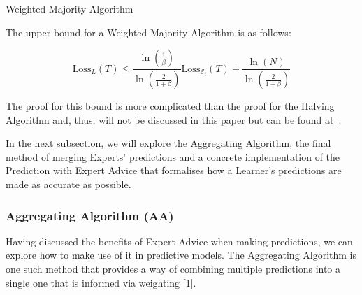 \begin{algorithm}[ht]
    \caption{Weighted Majority Algorithm}\label{weighted_majority_algorithm}
    \begin{algorithmic}[1]
    \end{algorithmic}
\end{algorithm}

The upper bound for a Weighted Majority Algorithm is as follows:

\begin{equation}
    \text{Loss}_L(T) \leq \frac{\ln (\frac{1}{\beta})}{\ln (\frac{2}{1 + \beta})} \text{Loss}_{\mathcal{E}_i}(T) + \frac{\ln(N)}{\ln(\frac{2}{1+\beta})}
\end{equation}

The proof for this bound is more complicated than the proof for the Halving Algorithm and, thus, will not be discussed in this paper but can be found at~\cite{littlestone:1994}.

In the next subsection, we will explore the Aggregating Algorithm, the final method of merging Experts' predictions and a concrete implementation of the Prediction with Expert Advice that formalises how a Learner's predictions are made as accurate as possible.

\subsubsection{Aggregating Algorithm (AA)}\label{subsubsection:aggregating_algorithm}
Having discussed the benefits of Expert Advice when making predictions, we can explore how to make use of it in predictive models. The Aggregating Algorithm is one such method that provides a way of combining multiple predictions into a single one that is informed via weighting [1].

